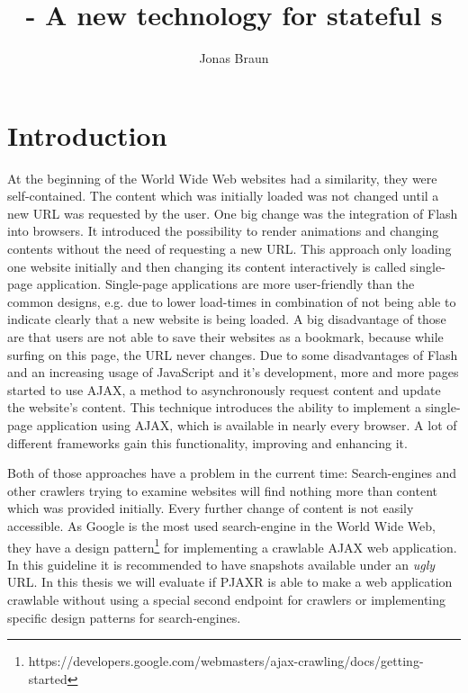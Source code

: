 \documentclass[f,bachelor,binding,twoside,palatino]{WeSTthesis}
\author{Jonas Braun}
\title{\pjaxr{} - A new technology for stateful \singlePageApplication{}s}
\def \ajax {AJAX}
\def \pjaxr {PJAXR}
\def \singlePageApplication {single-page application}
\def \SinglePageApplication {Single-page application}
\begin{document}

\maketitle %

\tableofcontents

\varclearpage



\addtocounter{footnote}

\section{Introduction}
    At the beginning of the World Wide Web websites had a similarity, they were self-contained. The content which was initially loaded was not changed until a new URL was requested by the user.
    One big change was the integration of Flash into browsers. It introduced the possibility to render animations and changing contents without the need of requesting a new URL.
    This approach only loading one website initially and then changing its content interactively is called \singlePageApplication{}.
    \SinglePageApplication{}s are more user-friendly than the common designs, e.g. due to lower load-times in combination of not being able to indicate clearly that a new website is being loaded.
    A big disadvantage of those are that users are not able to save their websites as a bookmark, because while surfing on this page, the URL never changes.
    Due to some disadvantages of Flash and an increasing usage of JavaScript and it's development, more and more pages started to use \ajax{}, a method to asynchronously request content and update the website's content. This technique introduces the ability to implement a \singlePageApplication{} using \ajax{}, which is available in nearly every browser. A lot of different frameworks gain this functionality, improving and enhancing it.

    Both of those approaches have a problem in the current time: Search-engines and other crawlers trying to examine websites will find nothing more than content which was provided initially. Every further change of content is not easily accessible.
    As Google is the most used search-engine in the World Wide Web, they have a design pattern\footnote{https://developers.google.com/webmasters/ajax-crawling/docs/getting-started} for implementing a crawlable \ajax{} web application. In this guideline it is recommended to have snapshots available under an \emph{ugly} URL.
    In this thesis we will evaluate if \pjaxr{} is able to make a web application crawlable without using a special second endpoint for crawlers or implementing specific design patterns for search-engines.
\end{document}

